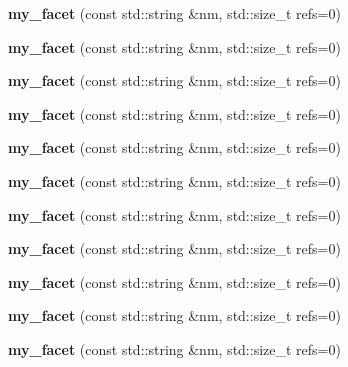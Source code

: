 \begin{DoxyCompactItemize}
{\bfseries my\+\_\+facet} (const std\+::string \&nm, std\+::size\+\_\+t refs=0)
\item 
\mbox{\label{structmy__facet_a6729ecd86319119e683a0c214f4c49ed}} 
{\bfseries my\+\_\+facet} (const std\+::string \&nm, std\+::size\+\_\+t refs=0)
\item 
\mbox{\label{structmy__facet_a6729ecd86319119e683a0c214f4c49ed}} 
{\bfseries my\+\_\+facet} (const std\+::string \&nm, std\+::size\+\_\+t refs=0)
\item 
\mbox{\label{structmy__facet_a6729ecd86319119e683a0c214f4c49ed}} 
{\bfseries my\+\_\+facet} (const std\+::string \&nm, std\+::size\+\_\+t refs=0)
\item 
\mbox{\label{structmy__facet_a6729ecd86319119e683a0c214f4c49ed}} 
{\bfseries my\+\_\+facet} (const std\+::string \&nm, std\+::size\+\_\+t refs=0)
\item 
\mbox{\label{structmy__facet_a6729ecd86319119e683a0c214f4c49ed}} 
{\bfseries my\+\_\+facet} (const std\+::string \&nm, std\+::size\+\_\+t refs=0)
\item 
\mbox{\label{structmy__facet_a6729ecd86319119e683a0c214f4c49ed}} 
{\bfseries my\+\_\+facet} (const std\+::string \&nm, std\+::size\+\_\+t refs=0)
\item 
\mbox{\label{structmy__facet_a6729ecd86319119e683a0c214f4c49ed}} 
{\bfseries my\+\_\+facet} (const std\+::string \&nm, std\+::size\+\_\+t refs=0)
\item 
\mbox{\label{structmy__facet_a6729ecd86319119e683a0c214f4c49ed}} 
{\bfseries my\+\_\+facet} (const std\+::string \&nm, std\+::size\+\_\+t refs=0)
\item 
\mbox{\label{structmy__facet_a6729ecd86319119e683a0c214f4c49ed}} 
{\bfseries my\+\_\+facet} (const std\+::string \&nm, std\+::size\+\_\+t refs=0)
\item 
\mbox{\label{structmy__facet_a6729ecd86319119e683a0c214f4c49ed}} 
{\bfseries my\+\_\+facet} (const std\+::string \&nm, std\+::size\+\_\+t refs=0)

\end{DoxyCompactItemize}
